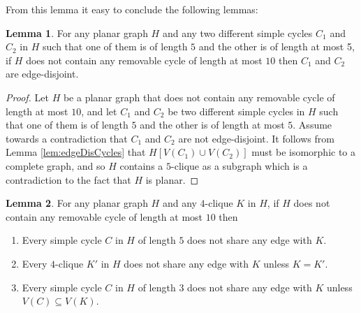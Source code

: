 \documentclass{article}
\theoremstyle{definition}
\newtheorem{lemma}{Lemma}[section]
\begin{document}
\medskip

From this lemma it easy to conclude the following lemmas:

\begin{lemma} For any planar graph $H$ and any two different simple cycles $C_1$ and $C_2$ in $H$ such that one of them is of length $5$ and the other is of length at most 5, if $H$ does not contain any removable cycle of length at most $10$ then $C_1$ and $C_2$ are edge-disjoint. \label{lem:cycleIsDisjoint}\end{lemma}

\begin{proof} Let $H$ be a planar graph that does not contain any removable cycle of length at most $10$, and let $C_1$ and $C_2$ be two different simple cycles in $H$ such that one of them is of length $5$ and the other is of length at most $5$. Assume towards a contradiction that $C_1$ and $C_2$ are not edge-disjoint. It follows from Lemma \ref{lem:edgeDisCycles} that $H[V(C_1) \cup V(C_2)]$ must be isomorphic to a complete graph, and so $H$ contains a $5$-clique as a subgraph which is a contradiction to the fact that $H$ is planar.\end{proof}

\begin{lemma} For any planar graph $H$ and any $4$-clique $K$ in $H$, if $H$ does not contain any removable cycle of length at most $10$ then
\begin{enumerate}
	\item \label{lem:case1} Every simple cycle $C$ in $H$ of length $5$ does not share any edge with $K$.
	\item \label{lem:case2} Every $4$-clique $K'$ in $H$ does not share any edge with $K$ unless $K = K'$.
	\item \label{lem:case3} Every simple cycle $C$ in $H$ of length $3$ does not share any edge with $K$ unless $V(C) \subseteq V(K)$.
\end{enumerate} \label{lem:cliqueIsDisjoint}\end{lemma}
\end{document}
